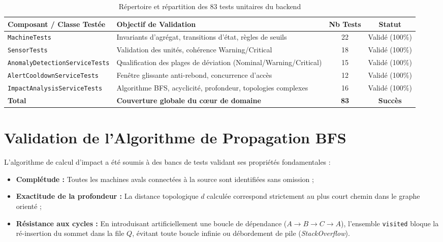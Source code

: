 \begin{table}[htbp]
\centering
\small
\caption{Répertoire et répartition des 83 tests unitaires du backend}
\label{tab:tests_backend}
\begin{tabularx}{\textwidth}{l Y c c}
\toprule
\textbf{Composant / Classe Testée} & \textbf{Objectif de Validation} & \textbf{Nb Tests} & \textbf{Statut} \\
\midrule
\texttt{MachineTests} & Invariants d'agrégat, transitions d'état, règles de seuils & 22 & Validé (100\%) \\
\texttt{SensorTests} & Validation des unités, cohérence Warning/Critical & 18 & Validé (100\%) \\
\texttt{AnomalyDetectionServiceTests} & Qualification des plages de déviation (Nominal/Warning/Critical) & 15 & Validé (100\%) \\
\texttt{AlertCooldownServiceTests} & Fenêtre glissante anti-rebond, concurrence d'accès & 12 & Validé (100\%) \\
\texttt{ImpactAnalysisServiceTests} & Algorithme BFS, acyclicité, profondeur, topologies complexes & 16 & Validé (100\%) \\
\midrule
\textbf{Total} & \textbf{Couverture globale du cœur de domaine} & \textbf{83} & \textbf{Succès} \\
\bottomrule
\end{tabularx}
\end{table}

\section{Validation de l'Algorithme de Propagation BFS}

L'algorithme de calcul d'impact a été soumis à des bancs de tests validant ses propriétés fondamentales :
\begin{itemize}
    \item \textbf{Complétude :} Toutes les machines avals connectées à la source sont identifiées sans omission ;
    \item \textbf{Exactitude de la profondeur :} La distance topologique $d$ calculée correspond strictement au plus court chemin dans le graphe orienté ;
    \item \textbf{Résistance aux cycles :} En introduisant artificiellement une boucle de dépendance ($A \rightarrow B \rightarrow C \rightarrow A$), l'ensemble \texttt{visited} bloque la ré-insertion du sommet dans la file $Q$, évitant toute boucle infinie ou débordement de pile (\textit{StackOverflow}).
\end{itemize}

